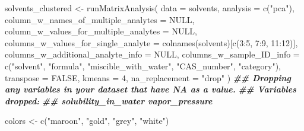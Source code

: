 \documentclass[
]{krantz}
\newenvironment{Shaded}{\begin{snugshade}}{\end{snugshade}}
\newcommand{\AttributeTok}[1]{\textcolor[rgb]{0.77,0.63,0.00}{#1}}
\newcommand{\ConstantTok}[1]{\textcolor[rgb]{0.00,0.00,0.00}{#1}}
\newcommand{\DecValTok}[1]{\textcolor[rgb]{0.00,0.00,0.81}{#1}}
\newcommand{\DocumentationTok}[1]{\textcolor[rgb]{0.56,0.35,0.01}{\textbf{\textit{#1}}}}
\newcommand{\FunctionTok}[1]{\textcolor[rgb]{0.00,0.00,0.00}{#1}}
\newcommand{\NormalTok}[1]{#1}
\newcommand{\OtherTok}[1]{\textcolor[rgb]{0.56,0.35,0.01}{#1}}
\newcommand{\SpecialCharTok}[1]{\textcolor[rgb]{0.00,0.00,0.00}{#1}}
\newcommand{\StringTok}[1]{\textcolor[rgb]{0.31,0.60,0.02}{#1}}
\begin{document}
\begin{Shaded}
\begin{Highlighting}[]
\NormalTok{solvents\_clustered }\OtherTok{\textless{}{-}} \FunctionTok{runMatrixAnalysis}\NormalTok{(}
  \AttributeTok{data =}\NormalTok{ solvents,}
  \AttributeTok{analysis =} \FunctionTok{c}\NormalTok{(}\StringTok{"pca"}\NormalTok{),}
  \AttributeTok{column\_w\_names\_of\_multiple\_analytes =} \ConstantTok{NULL}\NormalTok{,}
  \AttributeTok{column\_w\_values\_for\_multiple\_analytes =} \ConstantTok{NULL}\NormalTok{,}
  \AttributeTok{columns\_w\_values\_for\_single\_analyte =} \FunctionTok{colnames}\NormalTok{(solvents)[}\FunctionTok{c}\NormalTok{(}\DecValTok{3}\SpecialCharTok{:}\DecValTok{5}\NormalTok{, }\DecValTok{7}\SpecialCharTok{:}\DecValTok{9}\NormalTok{, }\DecValTok{11}\SpecialCharTok{:}\DecValTok{12}\NormalTok{)],}
  \AttributeTok{columns\_w\_additional\_analyte\_info =} \ConstantTok{NULL}\NormalTok{,}
  \AttributeTok{columns\_w\_sample\_ID\_info =} \FunctionTok{c}\NormalTok{(}\StringTok{"solvent"}\NormalTok{, }\StringTok{"formula"}\NormalTok{, }\StringTok{"miscible\_with\_water"}\NormalTok{, }\StringTok{"CAS\_number"}\NormalTok{, }\StringTok{"category"}\NormalTok{),}
  \AttributeTok{transpose =} \ConstantTok{FALSE}\NormalTok{,}
  \AttributeTok{kmeans =} \DecValTok{4}\NormalTok{,}
  \AttributeTok{na\_replacement =} \StringTok{"drop"}
\NormalTok{)}
\DocumentationTok{\#\# Dropping any variables in your dataset that have NA as a value.}
\DocumentationTok{\#\# Variables dropped:}
\DocumentationTok{\#\# solubility\_in\_water vapor\_pressure}

\NormalTok{colors }\OtherTok{\textless{}{-}} \FunctionTok{c}\NormalTok{(}\StringTok{"maroon"}\NormalTok{, }\StringTok{"gold"}\NormalTok{, }\StringTok{"grey"}\NormalTok{, }\StringTok{"white"}\NormalTok{)}


\end{Highlighting}
\end{Shaded}
\end{document}
